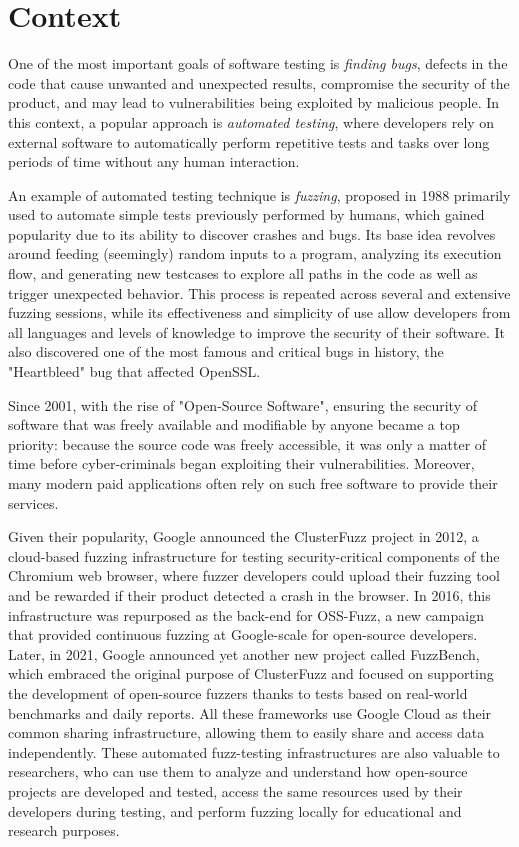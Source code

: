 \section{Context}
One of the most important goals of software testing is \textit{finding bugs}, defects in the code that cause unwanted and unexpected results, compromise the security of the product, and may lead to vulnerabilities being exploited by malicious people. In this context, a popular approach is \textit{automated testing}, where developers rely on external software to automatically perform repetitive tests and tasks over long periods of time without any human interaction.

An example of automated testing technique is \textit{fuzzing}, proposed in 1988 \cite{fuzz_proposed} primarily used to automate simple tests previously performed by humans, which gained popularity due to its ability to discover crashes and bugs. Its base idea revolves around feeding (seemingly) random inputs to a program, analyzing its execution flow, and generating new testcases to explore all paths in the code as well as trigger unexpected behavior. This process is repeated across several and extensive fuzzing sessions, while its effectiveness and simplicity of use allow developers from all languages and levels of knowledge to improve the security of their software. It also discovered one of the most famous and critical bugs in history, the "Heartbleed" bug that affected OpenSSL.

Since 2001, with the rise of "Open-Source Software", ensuring the security of software that was freely available and modifiable by anyone became a top priority: because the source code was freely accessible, it was only a matter of time before cyber-criminals began exploiting their vulnerabilities. Moreover, many modern paid applications often rely on such free software to provide their services. 

Given their popularity, Google announced the ClusterFuzz project in 2012, a cloud-based fuzzing infrastructure for testing security-critical components of the Chromium web browser, where fuzzer developers could upload their fuzzing tool and be rewarded if their product detected a crash in the browser. In 2016, this infrastructure was repurposed as the back-end for OSS-Fuzz, a new campaign that provided continuous fuzzing at Google-scale for open-source developers. Later, in 2021, Google announced yet another new project called FuzzBench, which embraced the original purpose of ClusterFuzz and focused on supporting the development of open-source fuzzers thanks to tests based on real-world benchmarks and daily reports. All these frameworks use Google Cloud as their common sharing infrastructure, allowing them to easily share and access data independently. These automated fuzz-testing infrastructures are also valuable to researchers, who can use them to analyze and understand how open-source projects are developed and tested, access the same resources used by their developers during testing, and perform fuzzing locally for educational and research purposes.


